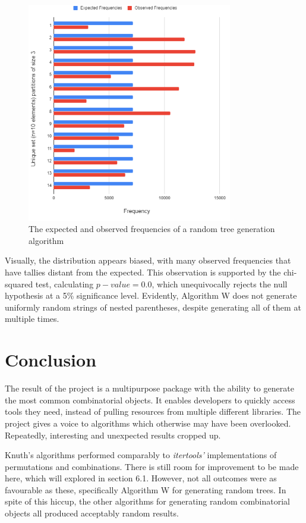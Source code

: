 \documentclass[12pt]{article}
\begin{document}
\begin{figure}[h]
\centering
\includegraphics[width=0.8\textwidth]{images/rand_tree.PNG}
\caption{The expected and observed frequencies of a random tree generation algorithm}
\end{figure}

Visually, the distribution appears biased, with many observed frequencies that have tallies distant from the expected. This observation is supported by the chi-squared test, calculating \(p-value=0.0\), which unequivocally rejects the null hypothesis at a 5\% significance level. Evidently, Algorithm W does not generate uniformly random strings of nested parentheses, despite generating all of them at multiple times.

\pagebreak

\section{Conclusion}
The result of the project is a multipurpose package with the ability to generate the most common combinatorial objects. It enables developers to quickly access tools they need, instead of pulling resources from multiple different libraries. The project gives a voice to algorithms which otherwise may have been overlooked. Repeatedly, interesting and unexpected results cropped up. 

Knuth's algorithms performed comparably to \textit{itertools'} implementations of permutations and combinations. There is still room for improvement to be made here, which will explored in section 6.1. However, not all outcomes were as favourable as these, specifically Algorithm W for generating random trees. In spite of this hiccup, the other algorithms for generating random combinatorial objects all produced acceptably random results.
\end{document}

